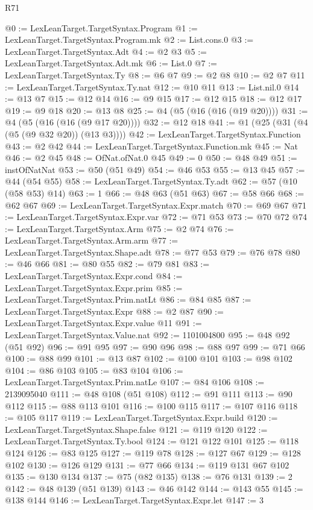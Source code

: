 \begin{lexlean}{R71}
\begin{coremodule}
@0 := LexLeanTarget.TargetSyntax.Program
@1 := LexLeanTarget.TargetSyntax.Program.mk
@2 := List.cons.{0}
@3 := LexLeanTarget.TargetSyntax.Adt
@4 := @2 @3
@5 := LexLeanTarget.TargetSyntax.Adt.mk
@6 := List.{0}
@7 := LexLeanTarget.TargetSyntax.Ty
@8 := @6 @7
@9 := @2 @8
@10 := @2 @7
@11 := LexLeanTarget.TargetSyntax.Ty.nat
@12 := @10 @11
@13 := List.nil.{0}
@14 := @13 @7
@15 := @12 @14
@16 := @9 @15
@17 := @12 @15
@18 := @12 @17
@19 := @9 @18
@20 := @13 @8
@25 := @4 (@5 (@16 (@16 (@19 @20))))
@31 := @4 (@5 (@16 (@16 (@9 @17 @20))))
@32 := @12 @18
@41 := @1 (@25 (@31 (@4 (@5 (@9 @32 @20)) (@13 @3))))
@42 := LexLeanTarget.TargetSyntax.Function
@43 := @2 @42
@44 := LexLeanTarget.TargetSyntax.Function.mk
@45 := Nat
@46 := @2 @45
@48 := OfNat.ofNat.{0} @45
@49 := 0
@50 := @48 @49
@51 := instOfNatNat
@53 := @50 (@51 @49)
@54 := @46 @53
@55 := @13 @45
@57 := @44 (@54 @55)
@58 := LexLeanTarget.TargetSyntax.Ty.adt
@62 := @57 (@10 (@58 @53) @14)
@63 := 1
@66 := @48 @63 (@51 @63)
@67 := @58 @66
@68 := @62 @67
@69 := LexLeanTarget.TargetSyntax.Expr.match
@70 := @69 @67
@71 := LexLeanTarget.TargetSyntax.Expr.var
@72 := @71 @53
@73 := @70 @72
@74 := LexLeanTarget.TargetSyntax.Arm
@75 := @2 @74
@76 := LexLeanTarget.TargetSyntax.Arm.arm
@77 := LexLeanTarget.TargetSyntax.Shape.adt
@78 := @77 @53
@79 := @76 @78
@80 := @46 @66
@81 := @80 @55
@82 := @79 @81
@83 := LexLeanTarget.TargetSyntax.Expr.cond
@84 := LexLeanTarget.TargetSyntax.Expr.prim
@85 := LexLeanTarget.TargetSyntax.Prim.natLt
@86 := @84 @85
@87 := LexLeanTarget.TargetSyntax.Expr
@88 := @2 @87
@90 := LexLeanTarget.TargetSyntax.Expr.value @11
@91 := LexLeanTarget.TargetSyntax.Value.nat
@92 := 1101004800
@95 := @48 @92 (@51 @92)
@96 := @91 @95
@97 := @90 @96
@98 := @88 @97
@99 := @71 @66
@100 := @88 @99
@101 := @13 @87
@102 := @100 @101
@103 := @98 @102
@104 := @86 @103
@105 := @83 @104
@106 := LexLeanTarget.TargetSyntax.Prim.natLe
@107 := @84 @106
@108 := 2139095040
@111 := @48 @108 (@51 @108)
@112 := @91 @111
@113 := @90 @112
@115 := @88 @113 @101
@116 := @100 @115
@117 := @107 @116
@118 := @105 @117
@119 := LexLeanTarget.TargetSyntax.Expr.build
@120 := LexLeanTarget.TargetSyntax.Shape.false
@121 := @119 @120
@122 := LexLeanTarget.TargetSyntax.Ty.bool
@124 := @121 @122 @101
@125 := @118 @124
@126 := @83 @125
@127 := @119 @78
@128 := @127 @67
@129 := @128 @102
@130 := @126 @129
@131 := @77 @66
@134 := @119 @131 @67 @102
@135 := @130 @134
@137 := @75 (@82 @135)
@138 := @76 @131
@139 := 2
@142 := @48 @139 (@51 @139)
@143 := @46 @142
@144 := @143 @55
@145 := @138 @144
@146 := LexLeanTarget.TargetSyntax.Expr.let
@147 := 3

\end{coremodule}
\end{lexlean}
